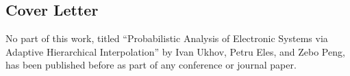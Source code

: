 \documentclass{article}
\newcommand{\header}[1]{%
  \begin{center}%
  \section*{{\Huge #1}}%
  \end{center}%
}
\begin{document}

  \header{Cover Letter}
  \Large
  No part of this work, titled ``Probabilistic Analysis of Electronic Systems
  via Adaptive Hierarchical Interpolation'' by Ivan Ukhov, Petru Eles, and Zebo
  Peng, has been published before as part of any conference or journal paper.

  
\end{document}
